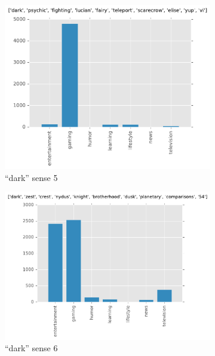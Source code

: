 \begin{landscape}
\begin{figure}[H]
\begin{subfigure}[t]{.3\textwidth}
\centering\includegraphics[]{figures/reddit-dark-4.pdf}
\caption{``dark'' sense 5}
\label{fig-reddit-dark-4}
\end{subfigure}
\begin{subfigure}[t]{.3\textwidth}
\centering\includegraphics[]{figures/reddit-dark-5.pdf}
\caption{``dark'' sense 6}
\label{fig-reddit-dark-5}
\end{subfigure}
\begin{subfigure}[t]{.3\textwidth}

\end{subfigure}
\end{figure}
\end{landscape}
